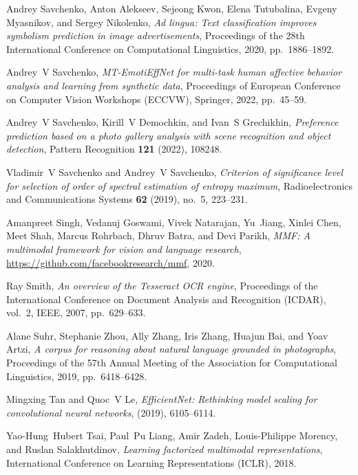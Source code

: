 \documentclass{zapiski}
\begin{document}
\begin{thebibliography}{10}
Andrey Savchenko, Anton Alekseev, Sejeong Kwon, Elena Tutubalina, Evgeny
  Myasnikov, and Sergey Nikolenko, \emph{Ad lingua: Text classification
  improves symbolism prediction in image advertisements}, Proceedings of the
  28th International Conference on Computational Linguistics, 2020,
  pp.~1886--1892.

Andrey~V Savchenko, \emph{{MT-EmotiEffNet} for multi-task human affective
  behavior analysis and learning from synthetic data}, Proceedings of European
  Conference on Computer Vision Workshops (ECCVW), Springer, 2022, pp.~45--59.

Andrey~V Savchenko, Kirill~V Demochkin, and Ivan~S Grechikhin, \emph{Preference
  prediction based on a photo gallery analysis with scene recognition and
  object detection}, Pattern Recognition \textbf{121} (2022), 108248.

Vladimir~V Savchenko and Andrey~V Savchenko, \emph{Criterion of significance
  level for selection of order of spectral estimation of entropy maximum},
  Radioelectronics and Communications Systems \textbf{62} (2019), no.~5,
  223--231.

Amanpreet Singh, Vedanuj Goswami, Vivek Natarajan, Yu~Jiang, Xinlei Chen, Meet
  Shah, Marcus Rohrbach, Dhruv Batra, and Devi Parikh, \emph{{MMF}: A
  multimodal framework for vision and language research},
  \url{https://github.com/facebookresearch/mmf}, 2020.

Ray Smith, \emph{An overview of the {Tesseract} {OCR} engine}, Proceedings of
  the International Conference on Document Analysis and Recognition (ICDAR),
  vol.~2, IEEE, 2007, pp.~629--633.

Alane Suhr, Stephanie Zhou, Ally Zhang, Iris Zhang, Huajun Bai, and Yoav Artzi,
  \emph{A corpus for reasoning about natural language grounded in photographs},
  Proceedings of the 57th Annual Meeting of the Association for Computational
  Linguistics, 2019, pp.~6418--6428.

Mingxing Tan and Quoc~V Le, \emph{{EfficientNet}: Rethinking model scaling for
  convolutional neural networks},  (2019), 6105--6114.

Yao-Hung~Hubert Tsai, Paul~Pu Liang, Amir Zadeh, Louis-Philippe Morency, and
  Ruslan Salakhutdinov, \emph{Learning factorized multimodal representations},
  International Conference on Learning Representations (ICLR), 2018.


\end{thebibliography}
\end{document}
